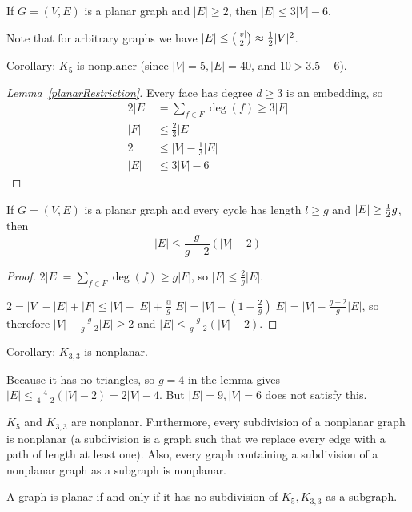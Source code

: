 \documentclass[12pt]{article}
\begin{document}
\begin{lemma}
\label{planarRestriction}
If $G = (V,E)$ is a planar graph and $|E| \geq 2$, then $|E| \leq 3|V| - 6$.
\end{lemma}

Note that for arbitrary graphs we have $|E| \leq {|v| \choose 2} \approx \frac{1}{2} |V|^2$.

Corollary: $K_5$ is nonplaner (since $|V| = 5, |E| = 40$, and $10 > 3.5 - 6$).

\begin{proof}[Lemma~\ref{planarRestriction}]
Every face has degree $d \geq 3$ is an embedding, so
\begin{align*}
2|E| &= \displaystyle\sum_{f\in F} \deg(f) \geq 3|F|\\
|F| &\leq \frac{2}{3}|E|\\
2 &\leq |V| - \frac{1}{3}|E|\\
|E| &\leq 3|V| - 6
\end{align*}
\end{proof}

\begin{lemma}
If $G = (V,E)$ is a planar graph and every cycle has length $l \geq g$ and $|E| \geq \frac{1}{2} g$, then \[ |E| \leq \frac{g}{g-2}(|V| - 2) \]
\end{lemma}

\begin{proof}
$2|E| = \displaystyle\sum_{f\in F} \deg(f) \geq g|F|$, so $|F| \leq \frac{2}{g} |E|$.

$2 = |V| - |E| + |F| \leq |V| - |E| + \frac{@}{g}|E| = |V| - (1-\frac{2}{g})|E| = |V| - \frac{g-2}{g}|E|$, so therefore $|V| - \frac{g}{g-2}|E| \geq 2$ and $|E| \leq \frac{g}{g-2}(|V| - 2)$.
\end{proof}

Corollary: $K_{3,3}$ is nonplanar.

Because it has no triangles, so $g=4$ in the lemma gives $|E| \leq \frac{4}{4-2}(|V| - 2) = 2|V| - 4$. But $|E| = 9, |V| = 6$ does not satisfy this.

$K_5$ and $K_{3,3}$ are nonplanar. Furthermore, every subdivision of a nonplanar graph is nonplanar (a subdivision is a graph such that we replace every edge with a path of length at least one). Also, every graph containing a subdivision of a nonplanar graph as a subgraph is nonplanar.

\begin{theorem}
A graph is planar if and only if it has no subdivision of $K_5, K_{3,3}$ as a subgraph.
\end{theorem}
\end{document}
